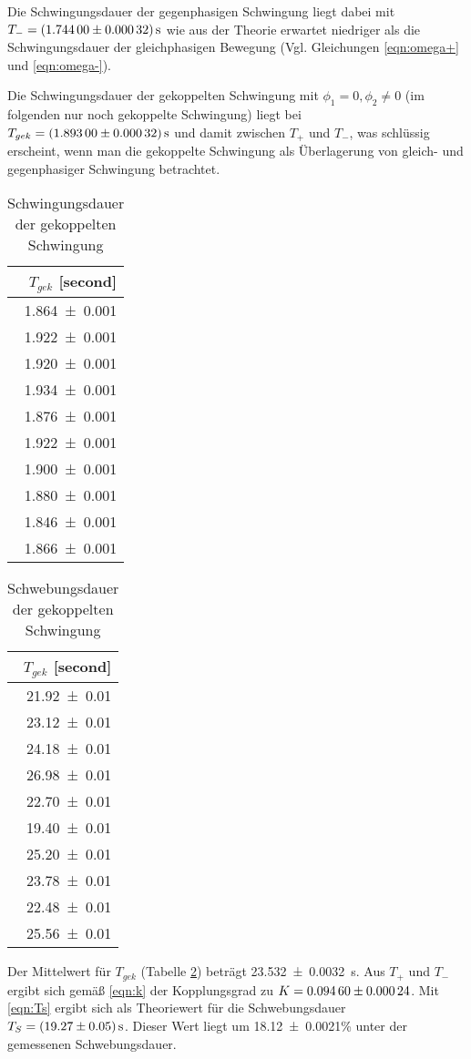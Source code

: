 Die Schwingungsdauer der gegenphasigen Schwingung liegt dabei mit
$T_-=\SI{1.744+-0.00032}{\second}$ wie aus der Theorie erwartet niedriger
als die Schwingungsdauer der gleichphasigen Bewegung
(Vgl. Gleichungen \ref{eqn:omega+} und \ref{eqn:omega-}).

Die Schwingungsdauer der gekoppelten Schwingung mit $\phi_1=0 , \phi_2\neq 0$
(im folgenden nur noch gekoppelte Schwingung) liegt bei
$T_{gek} = \SI{1.893+-0.00032}{\second}$ und damit zwischen $T_+$ und $T_-$,
was schlüssig erscheint, wenn man die gekoppelte Schwingung als Überlagerung
von gleich- und gegenphasiger Schwingung betrachtet.
\begin{table}
 \noindent
 \centering
 \caption{Schwingungsdauer der gekoppelten
 Schwingung}
 \label{tab:l1tgek}
 \begin{tabular}{r}
 \toprule
  {$T_{gek}$ [\si{second}]} \\
 \midrule
    \num{1.864 +- 0.001}\\
    \num{1.922 +- 0.001}\\
    \num{1.920 +- 0.001}\\
    \num{1.934 +- 0.001}\\
    \num{1.876 +- 0.001}\\
    \num{1.922 +- 0.001}\\
    \num{1.900 +- 0.001}\\
    \num{1.880 +- 0.001}\\
    \num{1.846 +- 0.001}\\
    \num{1.866 +- 0.001}\\
 \bottomrule
 \end{tabular}
\end{table}

\begin{table}
 \noindent
 \centering
 \caption{Schwebungsdauer der gekoppelten
 Schwingung}
 \label{tab:l1tschwebung}
 \begin{tabular}{r}
 \toprule
  {$T_{gek}$ [\si{second}]} \\
 \midrule
    \num{21.92 +- 0.01}\\
    \num{23.12 +- 0.01}\\
    \num{24.18 +- 0.01}\\
    \num{26.98 +- 0.01}\\
    \num{22.70 +- 0.01}\\
    \num{19.40 +- 0.01}\\
    \num{25.20 +- 0.01}\\
    \num{23.78 +- 0.01}\\
    \num{22.48 +- 0.01}\\
    \num{25.56 +- 0.01}\\
 \bottomrule
 \end{tabular}
\end{table}

Der Mittelwert für $T_{gek}$ (Tabelle \ref{tab:l1tschwebung})
beträgt \SI{23.532+-0.0032}{\second}.
Aus $T_+$ und $T_-$ ergibt sich gemäß \ref{eqn:k} der Kopplungsgrad zu
$K = \num{0.0946 +- 0.00024}$. Mit \ref{eqn:Ts} ergibt sich als Theoriewert
für die Schwebungsdauer $T_S = \SI{19.27+-0.05}{\second}$. Dieser Wert liegt
um \num{18.12+-0.0021}\% unter der gemessenen Schwebungsdauer.
